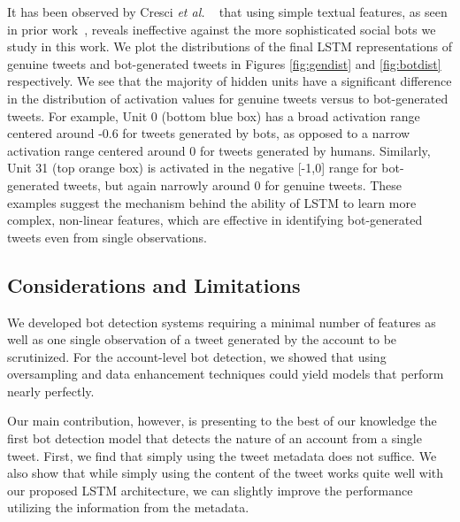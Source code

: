 It has been observed by Cresci \textit{et al.} ~\cite{cresci2017paradigm} that using simple textual features, as seen in prior work~\cite{miller2014twitter},  reveals ineffective against the more sophisticated social bots we study in this work. We plot the distributions of the final LSTM representations of genuine tweets and bot-generated tweets in Figures \ref{fig:gendist} and \ref{fig:botdist} respectively. We see that the majority of hidden units have a significant difference in the distribution of activation values for genuine tweets versus to bot-generated tweets. For example, Unit 0 (bottom blue box) has a broad activation range centered around -0.6 for tweets generated by bots, as opposed to a narrow activation range centered around 0 for tweets generated by humans. Similarly, Unit 31 (top orange box) is activated in the negative [-1,0] range for bot-generated tweets, but again narrowly around 0 for genuine tweets. These examples suggest the mechanism behind the ability of LSTM to learn more complex, non-linear features, which are effective in identifying bot-generated tweets even from single observations. \par 


\subsection{Considerations and Limitations}

We developed bot detection systems requiring a minimal number of features as well as one single observation of a tweet generated by the account to be scrutinized. For the account-level bot detection, we showed that using oversampling and data enhancement techniques could yield models that perform nearly perfectly. 

Our main contribution, however, is presenting to the best of our knowledge the first bot detection model that detects the nature of an account from a single tweet. First, we find that simply using the tweet metadata does not suffice. We also show that while simply using the content of the tweet works quite well with our proposed LSTM architecture, we can slightly improve the performance utilizing the information from the metadata. \par 




